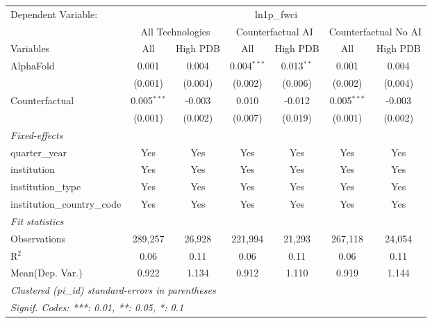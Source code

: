 \begingroup
\centering
\begin{tabular}{lcccccc}
   \tabularnewline \midrule \midrule
   Dependent Variable: & \multicolumn{6}{c}{ln1p\_fwci}\\
 & \multicolumn{2}{c}{All Technologies} & \multicolumn{2}{c}{Counterfactual AI} & \multicolumn{2}{c}{Counterfactual No AI} \\
\cmidrule(lr){1-1}\cmidrule(lr){2-3} \cmidrule(lr){4-5} \cmidrule(lr){6-7}
Variables & \multicolumn{1}{c}{All} & \multicolumn{1}{c}{High PDB} & \multicolumn{1}{c}{All} & \multicolumn{1}{c}{High PDB} & \multicolumn{1}{c}{All} & \multicolumn{1}{c}{High PDB} \\
\cmidrule(lr){1-1}\cmidrule(lr){2-2} \cmidrule(lr){3-3} \cmidrule(lr){4-4} \cmidrule(lr){5-5} \cmidrule(lr){6-6} \cmidrule(lr){7-7}
   AlphaFold                    & 0.001         & 0.004   & 0.004$^{***}$ & 0.013$^{**}$ & 0.001         & 0.004\\   
                                & (0.001)       & (0.004) & (0.002)       & (0.006)      & (0.002)       & (0.004)\\   
   Counterfactual               & 0.005$^{***}$ & -0.003  & 0.010         & -0.012       & 0.005$^{***}$ & -0.003\\   
                                & (0.001)       & (0.002) & (0.007)       & (0.019)      & (0.001)       & (0.002)\\   
   \midrule
   \emph{Fixed-effects}\\
   quarter\_year                & Yes           & Yes     & Yes           & Yes          & Yes           & Yes\\  
   institution                  & Yes           & Yes     & Yes           & Yes          & Yes           & Yes\\  
   institution\_type            & Yes           & Yes     & Yes           & Yes          & Yes           & Yes\\  
   institution\_country\_code   & Yes           & Yes     & Yes           & Yes          & Yes           & Yes\\  
   \midrule
   \emph{Fit statistics}\\
   Observations                 & 289,257       & 26,928  & 221,994       & 21,293       & 267,118       & 24,054\\  
   R$^2$                        & 0.06          & 0.11    & 0.06          & 0.11         & 0.06          & 0.11\\  
Mean(Dep. Var.) & 0.922 & 1.134 & 0.912 & 1.110 & 0.919 & 1.144 \\
   \midrule \midrule
   \multicolumn{7}{l}{\emph{Clustered (pi\_id) standard-errors in parentheses}}\\
   \multicolumn{7}{l}{\emph{Signif. Codes: ***: 0.01, **: 0.05, *: 0.1}}\\
\end{tabular}
\par\endgroup
